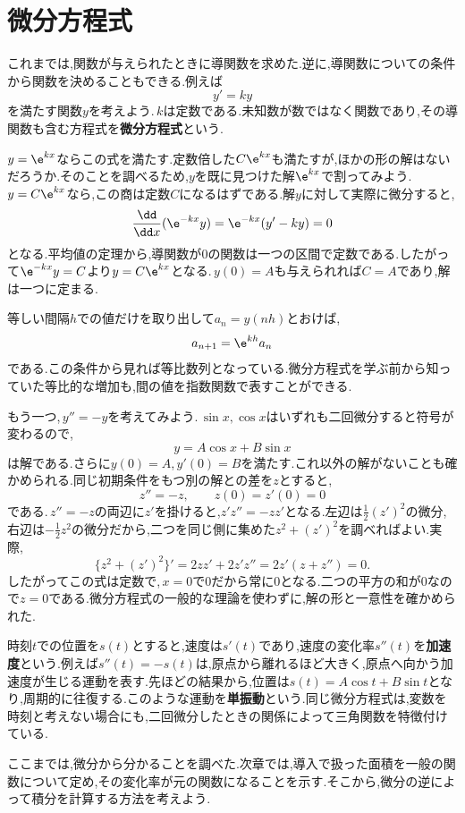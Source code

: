 \section{微分方程式}\label{節:微分方程式}
これまでは,関数が与えられたときに導関数を求めた.逆に,導関数についての条件から関数を決めることもできる.例えば
\[
 y'=ky
\]
を満たす関数$y$を考えよう.\,$k$は定数である.未知数が数ではなく関数であり,その導関数も含む方程式を\textbf{微分方程式}という.

$y=\e^{kx}$ならこの式を満たす.定数倍した$C\e^{kx}$も満たすが,ほかの形の解はないだろうか.そのことを調べるため,$y$を既に見つけた解$\e^{kx}$で割ってみよう.\,$y=C\e^{kx}$なら,この商は定数$C$になるはずである.解$y$に対して実際に微分すると,
\[
 \frac{\dd}{\dd x}(\e^{-kx}y)
 =\e^{-kx}(y'-ky)=0
\]
となる.平均値の定理から,導関数が$0$の関数は一つの区間で定数である.したがって$\e^{-kx}y=C$より$y=C\e^{kx}$となる.\,$y(0)=A$も与えられれば$C=A$であり,解は一つに定まる.

等しい間隔$h$での値だけを取り出して$a_n=y(nh)$とおけば,
\[
 a_{n+1}=\e^{kh}a_n
\]
である.この条件から見れば等比数列となっている.微分方程式を学ぶ前から知っていた等比的な増加も,間の値を指数関数で表すことができる.

もう一つ,\,$y''=-y$を考えてみよう.\,$\sin x,\cos x$はいずれも二回微分すると符号が変わるので,
\[
 y=A\cos x+B\sin x
\]
は解である.さらに$y(0)=A$,\,$y'(0)=B$を満たす.これ以外の解がないことも確かめられる.同じ初期条件をもつ別の解との差を$z$とすると,
\[
 z''=-z,\qquad z(0)=z'(0)=0
\]
である.\,$z''=-z$の両辺に$z'$を掛けると,$z'z''=-zz'$となる.左辺は$\frac12(z')^2$の微分,右辺は$-\frac12z^2$の微分だから,二つを同じ側に集めた$z^2+(z')^2$を調べればよい.実際,
\[
 \{z^2+(z')^2\}'=2zz'+2z'z''=2z'(z+z'')=0.
\]
したがってこの式は定数で,\,$x=0$で$0$だから常に$0$となる.二つの平方の和が$0$なので$z=0$である.微分方程式の一般的な理論を使わずに,解の形と一意性を確かめられた.

時刻$t$での位置を$s(t)$とすると,速度は$s'(t)$であり,速度の変化率$s''(t)$を\textbf{加速度}という.例えば$s''(t)=-s(t)$は,原点から離れるほど大きく,原点へ向かう加速度が生じる運動を表す.先ほどの結果から,位置は$s(t)=A\cos t+B\sin t$となり,周期的に往復する.このような運動を\textbf{単振動}という.同じ微分方程式は,変数を時刻と考えない場合にも,二回微分したときの関係によって三角関数を特徴付けている.

ここまでは,微分から分かることを調べた.次章では,導入で扱った面積を一般の関数について定め,その変化率が元の関数になることを示す.そこから,微分の逆によって積分を計算する方法を考えよう.
